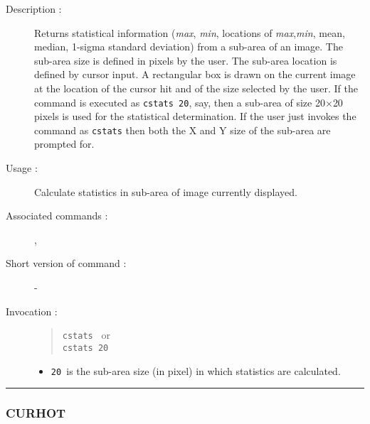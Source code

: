 \begin{description}

\item[Description :] Returns statistical information ({\it max},{\it
min}, locations of {\it max},{\it min}, mean, median, 1-sigma standard
deviation) from a sub-area of an image.  The sub-area size is defined
in pixels by the user.  The sub-area location is defined by cursor
input.  A rectangular box is drawn on the current image at the location
of the cursor hit and of the size selected by the user.  If the command
is executed as {\tt cstats~20}, say, then a sub-area of size
20$\times$20 pixels is used for the statistical determination.  If the
user just invokes the command as {\tt cstats} then both the X and Y
size of the sub-area are prompted for.

\item[Usage :] Calculate statistics in sub-area of image currently displayed.
\item[Associated commands :] {\tt {}}, 
{\tt {}}
\item[Short version of command :] -
\item[Invocation :]

\begin{quote}{\tt  cstats }
or \\
{\tt cstats 20 }
\end{quote}

\begin{itemize}

\item {\tt 20 }is the sub-area size (in pixel) in which statistics are
calculated.

\end{itemize}

\end{description}

\hrule 
\subsubsection*{\label{CURHOT}CURHOT}

